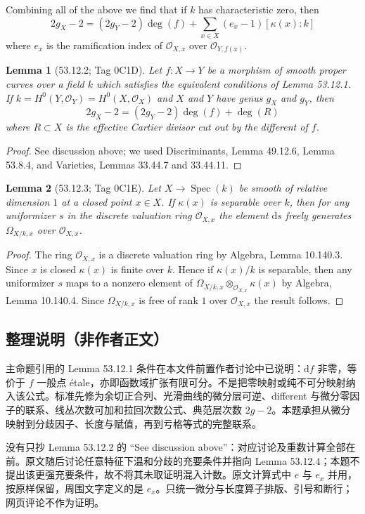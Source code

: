 \documentclass[UTF8,11pt]{ctexart}
\newtheorem*{lemma}{Lemma}
\theoremstyle{definition}
\DeclareMathOperator{\Spec}{Spec}
\begin{document}
Combining all of the above we find that if $k$ has characteristic zero, then
\[2g_X-2=(2g_Y-2)\deg(f)+\sum_{x\in X}(e_x-1)[\kappa(x):k]\]
where $e_x$ is the ramification index of $\mathcal O_{X,x}$ over $\mathcal O_{Y,f(x)}$.

\begin{lemma}[53.12.2; Tag 0C1D]
Let $f:X\to Y$ be a morphism of smooth proper curves over a field $k$ which satisfies the equivalent conditions of Lemma 53.12.1. If $k=H^0(Y,\mathcal O_Y)=H^0(X,\mathcal O_X)$ and $X$ and $Y$ have genus $g_X$ and $g_Y$, then
\[2g_X-2=(2g_Y-2)\deg(f)+\deg(R)\]
where $R\subset X$ is the effective Cartier divisor cut out by the different of $f$.
\end{lemma}
\begin{proof}
See discussion above; we used Discriminants, Lemma 49.12.6, Lemma 53.8.4, and Varieties, Lemmas 33.44.7 and 33.44.11.
\end{proof}
\begin{lemma}[53.12.3; Tag 0C1E]
Let $X\to\Spec(k)$ be smooth of relative dimension $1$ at a closed point $x\in X$. If $\kappa(x)$ is separable over $k$, then for any uniformizer $s$ in the discrete valuation ring $\mathcal O_{X,x}$ the element $\mathrm ds$ freely generates $\Omega_{X/k,x}$ over $\mathcal O_{X,x}$.
\end{lemma}
\begin{proof}
The ring $\mathcal O_{X,x}$ is a discrete valuation ring by Algebra, Lemma 10.140.3. Since $x$ is closed $\kappa(x)$ is finite over $k$. Hence if $\kappa(x)/k$ is separable, then any uniformizer $s$ maps to a nonzero element of $\Omega_{X/k,x}\otimes_{\mathcal O_{X,x}}\kappa(x)$ by Algebra, Lemma 10.140.4. Since $\Omega_{X/k,x}$ is free of rank $1$ over $\mathcal O_{X,x}$ the result follows.
\end{proof}

\subsection*{整理说明（非作者正文）}
主命题引用的 Lemma 53.12.1 条件在本文件前置作者讨论中已说明：$\mathrm df$ 非零，等价于 $f$ 一般点 \'etale，亦即函数域扩张有限可分。不是把零映射或纯不可分映射纳入该公式。标准先修为余切正合列、光滑曲线的微分层可逆、different 与微分零因子的联系、线丛次数可加和拉回次数公式、典范层次数 $2g-2$。本题承担从微分映射到分歧因子、长度与赋值，再到亏格等式的完整联系。

没有只抄 Lemma 53.12.2 的 ``See discussion above''：对应讨论及重数计算全部在前。原文随后讨论任意特征下温和分歧的充要条件并指向 Lemma 53.12.4；本题不提出该更强充要条件，故不将其未取证明混入计数。原文计算式中 $e$ 与 $e_x$ 并用，按原样保留，周围文字定义的是 $e_x$。只统一微分与长度算子排版、引号和断行；网页评论不作为证明。
\end{document}
